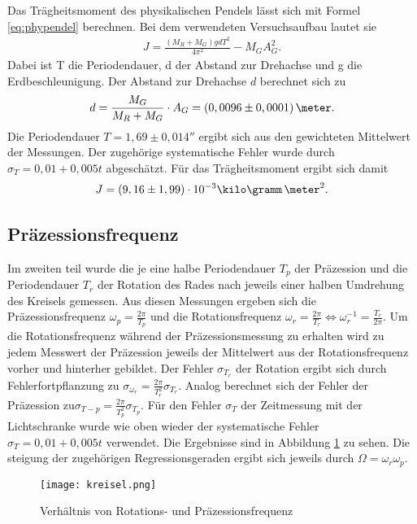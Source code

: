 \documentclass[12pt, a4paper, twoside]{scrartcl}
\begin{document}
Das Trägheitsmoment des physikalischen Pendels lässt sich mit Formel \ref{eq:phypendel} berechnen. Bei dem verwendeten Versuchsaufbau lautet sie
\begin{align*}
J=\frac{\left(M_R+M_G\right)gdT^2}{4\pi^2}-M_GA_G^2.
\end{align*}
Dabei ist T die Periodendauer, d der Abstand zur Drehachse und g die Erdbeschleunigung. Der Abstand zur Drehachse $d$ berechnet sich zu
\begin{align*}
d=\frac{M_G}{M_R+M_G}\cdot A_G=\left(0,0096\pm0,0001\right)\meter.
\end{align*}
Die Periodendauer $T=1,69\pm0,014\second$ ergibt sich aus den gewichteten Mittelwert der Messungen. Der zugehörige systematische Fehler wurde durch $\sigma_T=0,01+0,005t$ abgeschätzt. Für das Trägheitsmoment ergibt sich damit
\begin{align*}
J=\left(9,16\pm1,99\right)\cdot10^{-3}\kilo\gramm\,\meter^2.
\end{align*}



\subsection{Präzessionsfrequenz}
Im zweiten teil wurde die je eine halbe Periodendauer $T_p$ der Präzession und die Periodendauer $T_r$ der Rotation des Rades nach jeweils einer halben Umdrehung des Kreisels gemessen. Aus diesen Messungen ergeben sich die Präzessionsfrequenz $\omega_p=\frac{2\pi}{T_p}$ und die Rotationsfrequenz $\omega_r=\frac{2\pi}{T_r}\Leftrightarrow\omega_r^{-1}=\frac{T_r}{2\pi}$. Um die Rotationsfrequenz während der Präzessionsmessung zu erhalten wird zu jedem Messwert der Präzession jeweils der Mittelwert aus der Rotationsfrequenz vorher und hinterher gebildet. Der Fehler $\sigma_{T_r}$ der Rotation ergibt sich durch Fehlerfortpflanzung zu $\sigma_{\omega_r}=\frac{2\pi}{T_r^2}\sigma_{T_r}$. Analog berechnet sich der Fehler der Präzession zu$\sigma_{T-p}=\frac{2\pi}{T_p^2}\sigma_{T_p}$. Für den Fehler $\sigma_T$ der Zeitmessung mit der Lichtschranke wurde wie oben wieder der systematische Fehler $\sigma_T=0,01+0,005t$ verwendet. Die Ergebnisse sind in Abbildung \ref{fig:kreisel} zu sehen. Die steigung der zugehörigen Regressionsgeraden ergibt sich jeweils durch $\Omega=\omega_r\omega_p$.
\begin{figure} [H]
\centering
\texttt{[image: kreisel.png]}
\caption{\label{fig:kreisel}Verhältnis von Rotations- und Präzessionsfrequenz}
\end{figure}
\end{document}
